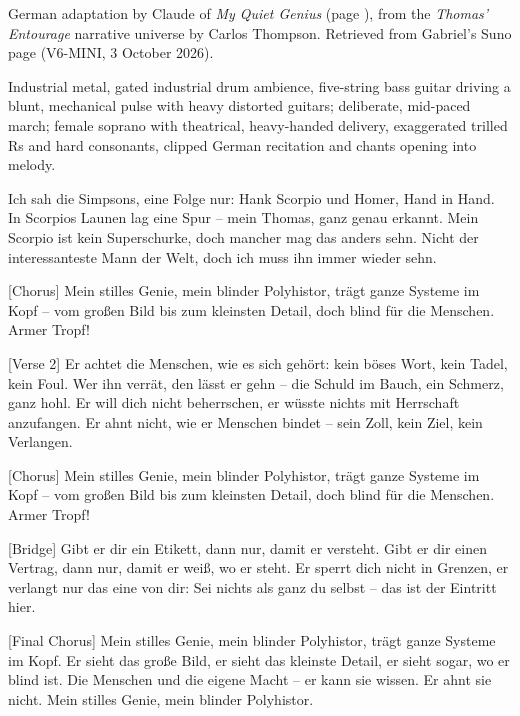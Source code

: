 \begin{notes}
German adaptation by Claude of \emph{My Quiet Genius} (page \pageref{sec:my-quiet-genius}), from the \emph{Thomas’ Entourage} narrative universe by Carlos Thompson. Retrieved from Gabriel's Suno page (V6-MINI, 3 October 2026).
\end{notes}
\begin{style}
Industrial metal, gated industrial drum ambience, five-string bass guitar driving a blunt, mechanical pulse with heavy distorted guitars; deliberate, mid-paced march; female soprano with theatrical, heavy-handed delivery, exaggerated trilled Rs and hard consonants, clipped German recitation and chants opening into melody.
\end{style}
\begin{lyrics}
[Verse 1]
Ich sah die Simpsons, eine Folge nur:
Hank Scorpio und Homer, Hand in Hand.
In Scorpios Launen lag eine Spur –
mein Thomas, ganz genau erkannt.
Mein Scorpio ist kein Superschurke,
doch mancher mag das anders sehn.
Nicht der interessanteste Mann der Welt,
doch ich muss ihn immer wieder sehn.

[Chorus]
Mein stilles Genie, mein blinder Polyhistor,
trägt ganze Systeme im Kopf –
vom großen Bild bis zum kleinsten Detail,
doch blind für die Menschen. Armer Tropf!

[Verse 2]
Er achtet die Menschen, wie es sich gehört:
kein böses Wort, kein Tadel, kein Foul.
Wer ihn verrät, den lässt er gehn –
die Schuld im Bauch, ein Schmerz, ganz hohl.
Er will dich nicht beherrschen,
er wüsste nichts mit Herrschaft anzufangen.
Er ahnt nicht, wie er Menschen bindet –
sein Zoll, kein Ziel, kein Verlangen.

[Chorus]
Mein stilles Genie, mein blinder Polyhistor,
trägt ganze Systeme im Kopf –
vom großen Bild bis zum kleinsten Detail,
doch blind für die Menschen. Armer Tropf!

[Bridge]
Gibt er dir ein Etikett,
dann nur, damit er versteht.
Gibt er dir einen Vertrag,
dann nur, damit er weiß, wo er steht.
Er sperrt dich nicht in Grenzen,
er verlangt nur das eine von dir:
Sei nichts als ganz du selbst –
das ist der Eintritt hier.

[Final Chorus]
Mein stilles Genie, mein blinder Polyhistor,
trägt ganze Systeme im Kopf.
Er sieht das große Bild,
er sieht das kleinste Detail,
er sieht sogar, wo er blind ist.
Die Menschen und die eigene Macht –
er kann sie wissen. Er ahnt sie nicht.
Mein stilles Genie,
mein blinder Polyhistor.
\end{lyrics}

